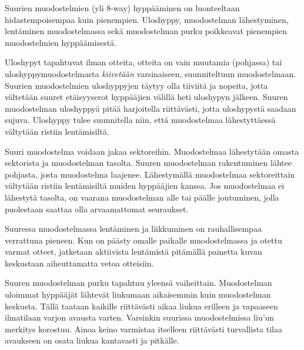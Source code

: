 
Suurien muodostelmien (yli 8-way) hyppääminen on luonteeltaan hidastempoisempaa kuin pienempien. Uloshyppy, muodostelman lähestyminen, lentäminen muodostelmassa sekä muodostelman purku poikkeavat pienempien muodostelmien hyppäämisestä. 


Uloshypyt tapahtuvat ilman otteita, otteita on vain muutamia (pohjassa) tai uloshyppymuodostelmasta \textit{kiivetään} varsinaiseen, suunniteltuun muodostelmaan. Suurien muodostelmien uloshyppyjen täytyy olla tiiviitä ja nopeita, jotta vältetään suuret etäisyyserot hyppääjien välillä heti uloshypyn jälkeen. Suuren muodostelman uloshyppyä pitää harjoitella riittävästi, jotta uloshypystä saadaan sujuva. Uloshyppy tulee suunnitella niin, että muodostelmaa lähestyttäessä vältytään ristiin lentämisiltä. 


Suuri muodostelma voidaan jakaa sektoreihin. Muodostelmaa lähestytään omasta sektorista ja muodostelman tasolta. Suuren muodostelman rakentuminen lähtee pohjasta, josta muodostelma laajenee. Lähestymällä muodostelmaa sektoreittain vältytään ristiin lentämisiltä muiden hyppääjien kanssa. Jos muodostelmaa ei lähestytä tasolta, on vaarana muodostelman alle tai päälle joutuminen, jolla puolestaan saattaa olla arvaamattomat seuraukset. 


Suuressa muodostelmassa lentäminen ja liikkuminen on rauhallisempaa verrattuna pieneen. Kun on päästy omalle paikalle muodostelmassa ja otettu varmat otteet, jatketaan aktiivista lentämistä pitämällä painetta kuvan keskustaan aiheuttamatta vetoa otteisiin. 


Suuren muodostelman purku tapahtuu yleensä vaiheittain. Muodostelman uloimmat hyppääjät lähtevät liukumaan aikaisemmin kuin muodostelman keskusta. Tällä taataan kaikille riittävästi aikaa liukua erilleen ja vapaaseen ilmatilaan varjon avausta varten. Varsinkin suurissa muodostelmissa liu'un merkitys korostuu. Ainoa keino varmistaa itselleen riittävästi turvallista tilaa avaukseen on osata liukua kantavasti ja pitkälle. 

